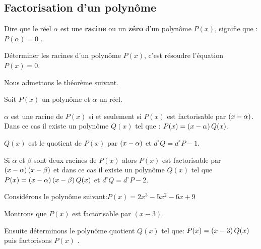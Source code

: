 \subsection{Factorisation d'un polynôme}
\begin{definition}

Dire que le réel  $ \alpha $   est une  \textbf{racine}  ou un  \textbf{zéro} d'un polynôme  $ P(x) $,  signifie   que : $ P(\alpha)=0 $ .
\end{definition}

\begin{remark}

 Déterminer les racines d'un polynôme $ P(x) $, c'est résoudre l'équation $ P(x)=0 $. 
\end{remark}

Nous admettons le théorème  suivant.

\begin{theorem}

Soit $ P(x) $  un polynôme  et $ \alpha $  un réel.

$ \alpha $  est une racine de $ P(x) $  si et seulement si $ P(x) $  est factorisable par $ \left(x-\alpha\right)$.\\ Dans ce cas il existe un polynôme $ Q(x) $ tel que : $  P(x)=\left(x-\alpha\right)Q(x) $.

$ Q(x) $  est le quotient de  $ P(x) $ par $ \left(x-\alpha\right)$  et $ d^{\circ}Q=d^{\circ}P-1 $.

\end{theorem}
\begin{remark}

 Si $\alpha $ et $\beta $ sont deux racines de  $ P(x) $  alors  $ P(x) $ est factorisable par $ \left(x-\alpha\right) \left(x-\beta\right) $ et dans ce cas il existe un polynôme $ Q(x)$  tel que $  P(x)=\left(x-\alpha\right)\left(x-\beta\right)Q(x) $  et $ d^{\circ}Q=d^{\circ}P-2 $.
\end{remark}
\begin{example}

Considérons le polynôme suivant:\;$ P(x)=  2x^{3}-5x^{2}-6x+9 $

 Montrons que $ P(x) $  est factorisable par $ (x-3) $.
 
 Ensuite déterminons le polynôme quotient $ Q(x) $ tel que: $  P(x)=\left(x-3\right)Q(x) $ puis factorisons $ P(x) $ .
\end{example}

